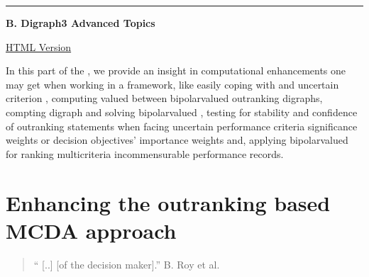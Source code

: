 \documentclass[a4paper,12pt,english]{sphinxhowto}
\begin{document}
\label{\detokenize{pearls:pearls-label}}

\bigskip\hrule\bigskip


\textbf{\Large{B. Digraph3 Advanced Topics}}

\href{https://digraph3.readthedocs.io/en/latest/index.html}{HTML Version}
\vspace{5mm}

\sphinxAtStartPar
In this part of the  , we provide an insight in computational enhancements one may get when working in a  framework, like \sphinxhyphen{} easily coping with  and uncertain criterion , \sphinxhyphen{} computing valued  between bipolar\sphinxhyphen{}valued outranking digraphs, \sphinxhyphen{} compting digraph  and solving bipolar\sphinxhyphen{}valued , \sphinxhyphen{} testing for stability and confidence of outranking statements when facing uncertain performance criteria significance weights or decision objectives’ importance weights and, \sphinxhyphen{} applying bipolar\sphinxhyphen{}valued  for ranking multicriteria incommensurable performance records.

\sphinxtableofcontents


\section{Enhancing the outranking based MCDA approach}
\label{\detokenize{pearls:enhancing-the-outranking-based-mcda-approach}}\label{\detokenize{pearls:enhancing-outranking-label}}\begin{quote}

\sphinxAtStartPar
“ {[}..{]}  {[}of the decision maker{]}.”  \textendash{} B. Roy et al. %
\begin{footnote}[13]\sphinxAtStartFootnote
{}
%
\end{footnote}
\end{quote}
\end{document}
